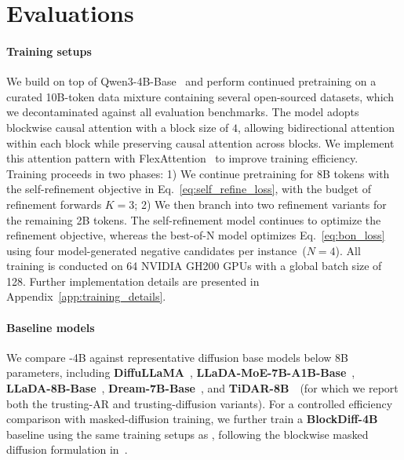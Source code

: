 \vspace{-10pt}
\section{Evaluations}
\vspace{-10pt}

\label{sec:experiments}



\paragraph{Training setups} We build \method on top of Qwen3-4B-Base~\citep{qwen3} and perform continued pretraining on a curated 10B-token data mixture containing several open-sourced datasets, which we decontaminated against all evaluation benchmarks. 
The model adopts blockwise causal attention with a block size of $4$, allowing bidirectional attention within each block while preserving causal attention across blocks. 
We implement this attention pattern with FlexAttention~\citep{flex_attn} to improve training efficiency.
Training proceeds in two phases:
1) We continue pretraining for 8B tokens with the self-refinement objective in Eq.~\eqref{eq:self_refine_loss}, with the budget of refinement forwards $K=3$;
2) We then branch into two refinement variants for the remaining 2B tokens. 
The self-refinement model continues to optimize the refinement objective, whereas the best-of-N model optimizes Eq.~\eqref{eq:bon_loss} using four model-generated negative candidates per instance~($N=4$). 
All training is conducted on 64 NVIDIA GH200 GPUs with a global batch size of 128.
Further implementation details are presented in Appendix~\ref{app:training_details}.

\paragraph{Baseline models}
We compare \method-4B against representative diffusion base models below 8B parameters, including \textbf{DiffuLLaMA}~\citep{DiffuLLaMA}, \textbf{LLaDA-MoE-7B-A1B-Base}~\citep{llada-moe}, \textbf{LLaDA-8B-Base}~\citep{LLaDA}, \textbf{Dream-7B-Base}~\citep{dream7b}, and \textbf{TiDAR-8B}~\citep{tidar}~(for which we report both the trusting-AR and trusting-diffusion variants). 
For a controlled efficiency comparison with masked-diffusion training, we further train a \textbf{BlockDiff-4B} baseline using the same training setups as \method, following the blockwise masked diffusion formulation in~\citep{block_diffusion}.

